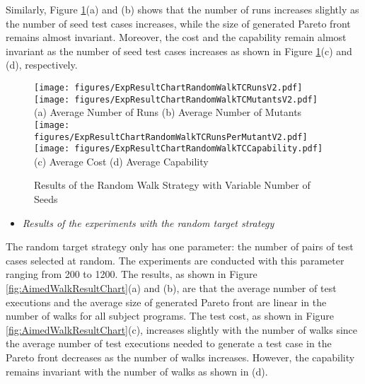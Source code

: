 \documentclass[preprint,1p,authoryear,times]{elsarticle}
\begin{document}
Similarly, Figure \ref{fig:RandomWalkTCResultChart}(a) and (b) shows that the number of runs increases slightly as the number of seed test cases increases, while the size of generated Pareto front remains almost invariant. Moreover, the cost and the capability remain almost invariant as the number of seed test cases increases as shown in Figure \ref{fig:RandomWalkTCResultChart}(c) and (d), respectively.  

\begin{figure}[htbp]
	\centering
	\texttt{[image: figures/ExpResultChartRandomWalkTCRunsV2.pdf]}
	\texttt{[image: figures/ExpResultChartRandomWalkTCMutantsV2.pdf]}\\
	\scriptsize{(a) Average Number of Runs \hspace{2cm} (b) Average Number of Mutants} \\
	\texttt{[image: figures/ExpResultChartRandomWalkTCRunsPerMutantV2.pdf]}			\texttt{[image: figures/ExpResultChartRandomWalkTCCapability.pdf]}\\
	\scriptsize{(c) Average Cost \hspace{3cm} (d) Average Capability} 
	\caption{Results of the Random Walk Strategy with Variable Number of Seeds}
	\label{fig:RandomWalkTCResultChart}
\end{figure}

\begin{itemize}
\item \emph{Results of the experiments with the random target strategy}
\end{itemize}

The random target strategy only has one parameter: the number of pairs of test cases selected at random. The experiments are conducted with this parameter ranging from 200 to 1200. The results, as shown in Figure \ref{fig:AimedWalkResultChart}(a) and (b), are that the average number of test executions and the average size of generated Pareto front are linear in the number of walks for all subject programs. The test cost, as shown in Figure \ref{fig:AimedWalkResultChart}(c), increases slightly with the number of walks since the average number of test executions needed to generate a test case in the Pareto front decreases as the number of walks increases. However, the capability remains invariant with the number of walks as shown in (d). 
\end{document}
